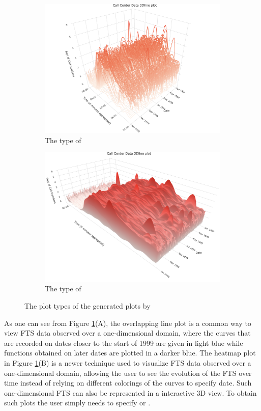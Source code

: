 \begin{figure}[ht!]
\begin{subfigure}[b]{0.49\textwidth}
		\includegraphics[width=\textwidth]{figures/3Dline.png}
		\caption{The type of }
	\end{subfigure}
	\begin{subfigure}[b]{0.49\textwidth}
		\includegraphics[width=\textwidth]{figures/3Dsurface.png}
		\caption{The type of }
	\end{subfigure}
	\caption{The plot types of the generated plots by }
	\label{fig:call_center}
\end{figure}
As one can see from Figure \ref{fig:call_center}(A), the overlapping line plot is 
a common way to view FTS data observed over a one-dimensional domain, where the 
curves that are recorded on dates closer to the start of 1999 are given in light 
blue while functions obtained on later dates are plotted in a darker blue. The 
heatmap plot in Figure \ref{fig:call_center}(B) is a newer technique used to 
visualize FTS data observed over a one-dimensional domain, allowing the user to see 
the evolution of the FTS over time instead of relying on different colorings of 
the curves to specify date. Such one-dimensional FTS can also be represented in a 
interactive 3D view. To obtain such plots the user simply needs to specify 
 or .
